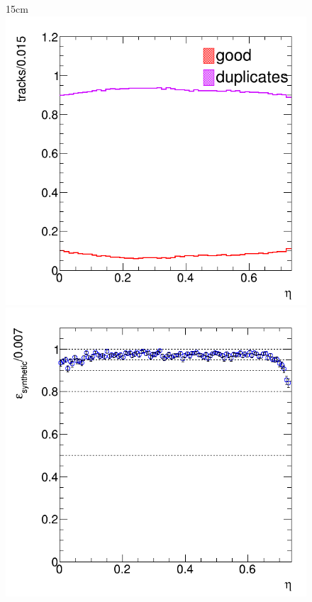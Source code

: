 \begin{figure}[htbp]{15cm}
	\includegraphics[scale=0.23]{AppendixCMSL1TT/figs/single_muon_nopu_tcat/am_tracks_ratio_vs_eta_allogics_nodupremoval}
	\includegraphics[scale=0.23]{AppendixCMSL1TT/figs/single_muon_nopu_tcat/am_tracks_reco_eff_vs_eta_allogics_nodupremoval}

\end{figure}
